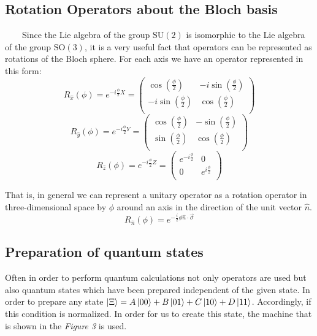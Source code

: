 \documentclass[english,14pt,a4paper]{article}
\begin{document}
	\subsection{Rotation Operators about the Bloch basis}\ \ \ \
	Since the Lie algebra of the group $\text{SU}(2)$ is isomorphic to the Lie algebra of the group $\text{SO}(3)$, it is a very useful fact that operators can be represented as rotations of the Bloch sphere. For each axis we have an operator represented in this form:
	\[
		R_{\hat{x}}(\phi) = e^{-i\frac{\phi}{2}X} = \begin{pmatrix}
			\cos(\frac{\phi}{2}) & -i\sin(\frac{\phi}{2}) \\
			-i\sin(\frac{\phi}{2}) & \cos(\frac{\phi}{2}) \\
		\end{pmatrix}	
	\]
	\[
	R_{\hat{y}}(\phi) = e^{-i\frac{\phi}{2}Y} = \begin{pmatrix}
		\cos(\frac{\phi}{2}) & -\sin(\frac{\phi}{2}) \\
		\sin(\frac{\phi}{2}) & \cos(\frac{\phi}{2}) \\
	\end{pmatrix}	
	\]
	\[
	R_{\hat{z}}(\phi) = e^{-i\frac{\phi}{2}Z} = \begin{pmatrix}
		e^{-i\frac{\phi}{2}} & 0 \\
		0 &  e^{i\frac{\phi}{2}}\\
	\end{pmatrix}	
	\]
	
	That is, in general we can represent a unitary operator as a rotation operator in three-dimensional space by $\phi$ around an axis in the direction of the unit vector $\hat{n}$.
	 \begin{equation}
	 R_{\hat{n}}(\phi) = e^{-\frac{i}{2}\phi \hat{n}\cdot \vec{\sigma}}
	\end{equation}
	\subsection{Preparation of quantum states}
	Often in order to perform quantum calculations not only operators are used but also quantum states which have been prepared independent of the given state.  In order to prepare any state $\ket{\Xi} = A \ket{00} + B \ket{01} + C \ket{10} + D\ket{11}$. Accordingly, if this condition is normalized. In order for us to create this state, the machine that is shown in the \textit{Figure 3} is used.
	
\end{document}
